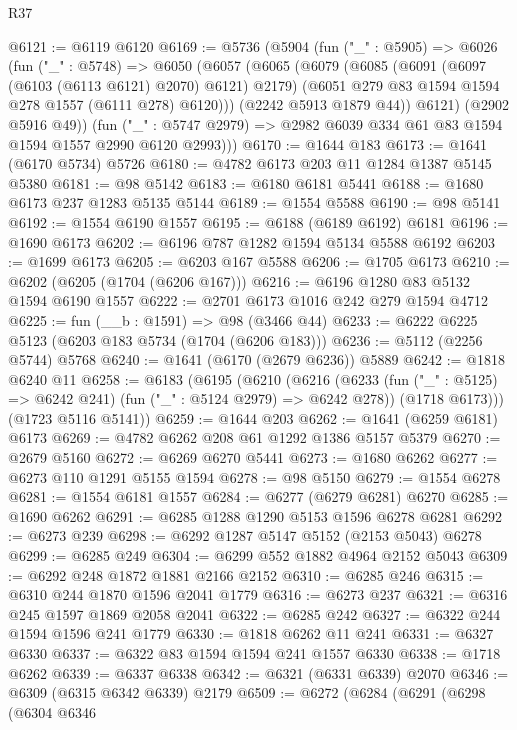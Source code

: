 \begin{lexlean}{R37}
\begin{coremodule}
@6121 := @6119 @6120
@6169 := @5736
    (@5904
      (fun ("_" : @5905) =>
      @6026
        (fun ("_" : @5748) =>
        @6050
          (@6057
            (@6065
              (@6079
                (@6085
                  (@6091 (@6097 (@6103 (@6113 @6121) @2070) @6121) @2179)
                  (@6051 @279 @83 @1594 @1594 @278 @1557 (@6111 @278) @6120)))
              (@2242 @5913 @1879 @44))
            @6121)
          (@2902 @5916 @49))
        (fun ("_" : @5747 @2979) => @2982 @6039 @334 @61 @83 @1594 @1594 @1557 @2990 @6120 @2993)))
@6170 := @1644 @183
@6173 := @1641 (@6170 @5734) @5726
@6180 := @4782 @6173 @203 @11 @1284 @1387 @5145 @5380
@6181 := @98 @5142
@6183 := @6180 @6181 @5441
@6188 := @1680 @6173 @237 @1283 @5135 @5144
@6189 := @1554 @5588
@6190 := @98 @5141
@6192 := @1554 @6190 @1557
@6195 := @6188 (@6189 @6192) @6181
@6196 := @1690 @6173
@6202 := @6196 @787 @1282 @1594 @5134 @5588 @6192
@6203 := @1699 @6173
@6205 := @6203 @167 @5588
@6206 := @1705 @6173
@6210 := @6202 (@6205 (@1704 (@6206 @167)))
@6216 := @6196 @1280 @83 @5132 @1594 @6190 @1557
@6222 := @2701 @6173 @1016 @242 @279 @1594 @4712
@6225 := fun (__b : @1591) => @98 (@3466 @44)
@6233 := @6222 @6225 @5123 (@6203 @183 @5734 (@1704 (@6206 @183)))
@6236 := @5112 (@2256 @5744) @5768
@6240 := @1641 (@6170 (@2679 @6236)) @5889
@6242 := @1818 @6240 @11
@6258 := @6183
    (@6195
      (@6210
        (@6216
          (@6233 (fun ("_" : @5125) => @6242 @241) (fun ("_" : @5124 @2979) => @6242 @278))
          (@1718 @6173)))
      (@1723 @5116 @5141))
@6259 := @1644 @203
@6262 := @1641 (@6259 @6181) @6173
@6269 := @4782 @6262 @208 @61 @1292 @1386 @5157 @5379
@6270 := @2679 @5160
@6272 := @6269 @6270 @5441
@6273 := @1680 @6262
@6277 := @6273 @110 @1291 @5155 @1594
@6278 := @98 @5150
@6279 := @1554 @6278
@6281 := @1554 @6181 @1557
@6284 := @6277 (@6279 @6281) @6270
@6285 := @1690 @6262
@6291 := @6285 @1288 @1290 @5153 @1596 @6278 @6281
@6292 := @6273 @239
@6298 := @6292 @1287 @5147 @5152 (@2153 @5043) @6278
@6299 := @6285 @249
@6304 := @6299 @552 @1882 @4964 @2152 @5043
@6309 := @6292 @248 @1872 @1881 @2166 @2152
@6310 := @6285 @246
@6315 := @6310 @244 @1870 @1596 @2041 @1779
@6316 := @6273 @237
@6321 := @6316 @245 @1597 @1869 @2058 @2041
@6322 := @6285 @242
@6327 := @6322 @244 @1594 @1596 @241 @1779
@6330 := @1818 @6262 @11 @241
@6331 := @6327 @6330
@6337 := @6322 @83 @1594 @1594 @241 @1557 @6330
@6338 := @1718 @6262
@6339 := @6337 @6338
@6342 := @6321 (@6331 @6339) @2070
@6346 := @6309 (@6315 @6342 @6339) @2179
@6509 := @6272
    (@6284
      (@6291
        (@6298
          (@6304
            @6346

\end{coremodule}
\end{lexlean}
